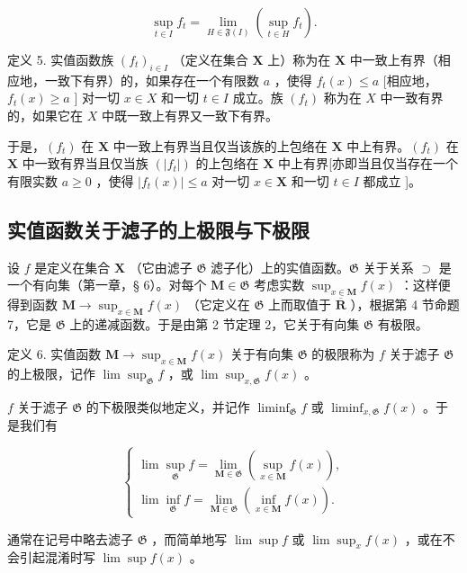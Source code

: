\[
\sup _ {t \in I} f _ {t} = \lim _ {H \in \mathfrak {F} (I)} \left(\sup _ {t \in H} f _ {t}\right).\tag{9}
\]

定义 5. 实值函数族 \((f_t)_{i\in I}\) （定义在集合 \(\mathbf{X}\) 上）称为在 \(\mathbf{X}\) 中一致上有界（相应地，一致下有界）的，如果存在一个有限数 \(a\) ，使得 \(f_{t}(x) \leqslant a\) {[}相应地，\(f_{t}(x) \geqslant a\) {]} 对一切 \(x \in X\) 和一切 \(t \in I\) 成立。族 \((f_{t})\) 称为在 \(X\) 中一致有界的，如果它在 \(X\) 中既一致上有界又一致下有界。

于是，\((f_{t})\) 在 \(\mathbf{X}\) 中一致上有界当且仅当该族的上包络在 \(\mathbf{X}\) 中上有界。\((f_{t})\) 在 \(\mathbf{X}\) 中一致有界当且仅当族 \((|f_{t}|)\) 的上包络在 \(\mathbf{X}\) 中上有界{[}亦即当且仅当存在一个有限实数 \(a \geqslant 0\) ，使得 \(|f_{t}(x)| \leqslant a\) 对一切 \(x \in \mathbf{X}\) 和一切 \(t \in I\) 都成立 {]}。

\subsection{实值函数关于滤子的上极限与下极限}

设 \(f\) 是定义在集合 \(\mathbf{X}\) （它由滤子 \(\mathfrak{G}\) 滤子化）上的实值函数。\(\mathfrak{G}\) 关于关系 \(\supset\) 是一个有向集（第一章，§ 6）。对每个 \(\mathbf{M} \in \mathfrak{G}\) 考虑实数 \(\sup_{x \in \mathbf{M}} f(x)\) ：这样便得到函数 \(\mathbf{M} \to \sup_{x \in \mathbf{M}} f(x)\) （它定义在 \(\mathfrak{G}\) 上而取值于 \(\overline{\mathbf{R}}\) ），根据第 4 节命题 7，它是 \(\mathfrak{G}\) 上的递减函数。于是由第 2 节定理 2，它关于有向集 \(\mathfrak{G}\) 有极限。

定义 6. 实值函数 \(\mathbf{M} \to \sup_{x \in \mathbf{M}} f(x)\) 关于有向集 \(\mathfrak{G}\) 的极限称为 \(f\) 关于滤子 \(\mathfrak{G}\) 的上极限，记作 \(\lim \sup_{\mathfrak{G}} f\) ，或 \(\lim \sup_{x, \mathfrak{G}} f(x)\) 。

\(f\) 关于滤子 \(\mathfrak{G}\) 的下极限类似地定义，并记作 \(\liminf_{\mathfrak{G}} f\) 或 \(\liminf_{x, \mathfrak{G}} f(x)\) 。于是我们有

\[
\left\{ \begin{array}{l} \lim \sup_{\mathfrak{G}} f = \lim_{\mathbf {M} \in \mathfrak {G}}(\sup_{x \in \mathbf {M}}f(x)), \\ \lim \inf_{\mathfrak{G}} f = \lim_{\mathbf {M} \in \mathfrak {G}}(\inf_{x \in \mathbf {M}}f(x)). \end{array} \right.\tag{10}
\]

通常在记号中略去滤子 \(\mathfrak{G}\) ，而简单地写 \(\lim \sup f\) 或 \(\lim \sup_x f(x)\) ，或在不会引起混淆时写 \(\lim \sup f(x)\) 。


